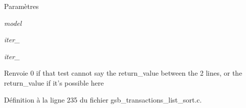 \begin{DoxyParams}{Paramètres}
\item[{\em model}]\item[{\em iter\_\-1}]\item[{\em iter\_\-2}]\end{DoxyParams}
\begin{DoxyReturn}{Renvoie}
0 if that test cannot say the return\_\-value between the 2 lines, or the return\_\-value if it's possible here 
\end{DoxyReturn}


Définition à la ligne 235 du fichier gsb\_\-transactions\_\-list\_\-sort.c.

